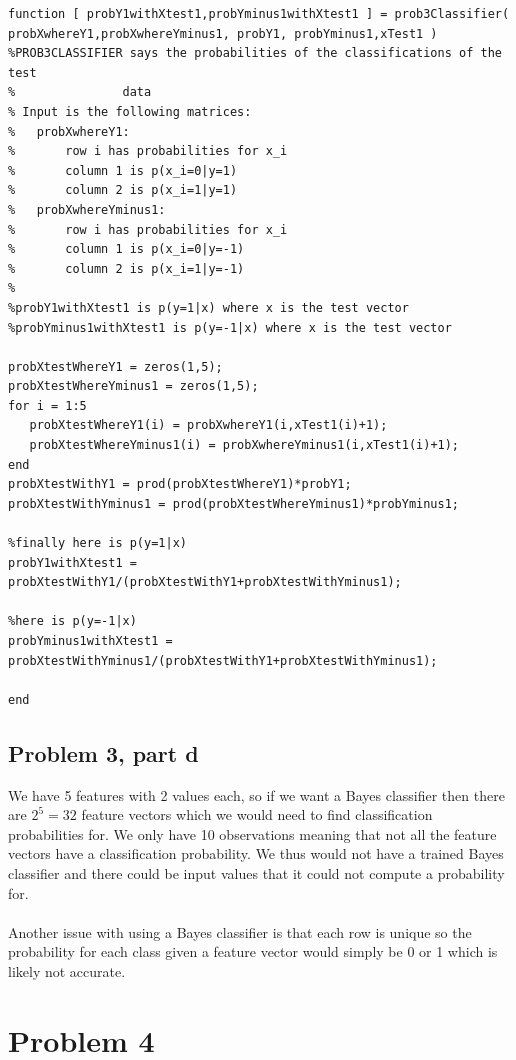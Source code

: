\documentclass[11pt,psfig]{article}
\begin{document}
\begin{verbatim}
function [ probY1withXtest1,probYminus1withXtest1 ] = prob3Classifier( 
probXwhereY1,probXwhereYminus1, probY1, probYminus1,xTest1 )
%PROB3CLASSIFIER says the probabilities of the classifications of the test
%               data
% Input is the following matrices:
%   probXwhereY1:
%       row i has probabilities for x_i
%       column 1 is p(x_i=0|y=1)
%       column 2 is p(x_i=1|y=1)
%   probXwhereYminus1:
%       row i has probabilities for x_i
%       column 1 is p(x_i=0|y=-1)
%       column 2 is p(x_i=1|y=-1)
%
%probY1withXtest1 is p(y=1|x) where x is the test vector
%probYminus1withXtest1 is p(y=-1|x) where x is the test vector

probXtestWhereY1 = zeros(1,5);
probXtestWhereYminus1 = zeros(1,5);
for i = 1:5
   probXtestWhereY1(i) = probXwhereY1(i,xTest1(i)+1); 
   probXtestWhereYminus1(i) = probXwhereYminus1(i,xTest1(i)+1); 
end
probXtestWithY1 = prod(probXtestWhereY1)*probY1;
probXtestWithYminus1 = prod(probXtestWhereYminus1)*probYminus1;

%finally here is p(y=1|x)
probY1withXtest1 = probXtestWithY1/(probXtestWithY1+probXtestWithYminus1);

%here is p(y=-1|x)
probYminus1withXtest1 = probXtestWithYminus1/(probXtestWithY1+probXtestWithYminus1);

end
\end{verbatim}

\newpage

\subsection*{Problem 3, part d}

We have 5 features with 2 values each, so if we want a Bayes classifier then there are $2^5=32$ feature vectors which we would need to find classification probabilities for. We only have 10 observations meaning that not all the feature vectors have a classification probability. We thus would not have a trained Bayes classifier and there could be input values that it could not compute a probability for.\\
\\
Another issue with using a Bayes classifier is that each row is unique so the probability for each class given a feature vector would simply be 0 or 1 which is likely not accurate.

\newpage

\section*{Problem 4}
\end{document}
